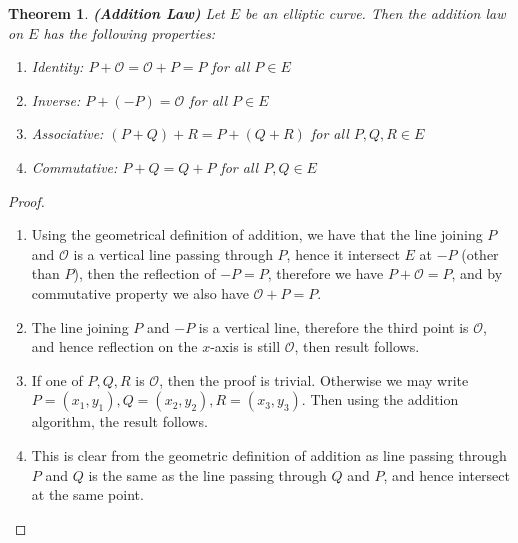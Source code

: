\documentclass[a4 paper]{article}
\newcommand{\?}{\stackrel{?}{=}}
\newtheorem{theorem}{Theorem}[section]
\begin{document}
\begin{tcolorbox}
\begin{theorem}
\textbf{(Addition Law)} Let $ E $ be an elliptic curve. Then the addition law on $ E $ has the following properties: 
\begin{enumerate}
    \item Identity: $ P+ \mathcal{O} = \mathcal{O} + P = P $ for all $  P \in E $
    \item Inverse: $ P + (-P) = \mathcal{O} $ for all $ P \in E $
    \item Associative: $ (P+Q) + R  = P + (Q +R) $  for all $ P, Q , R \in E $
    \item Commutative: $ P +Q = Q +P  $ for all $ P , Q \in E $
\end{enumerate}

\end{theorem}
\end{tcolorbox}

\begin{tcolorbox}[breakable,colback=blue!5!white, colframe=blue!50!black]
\begin{proof}
\begin{enumerate}
    \item Using the geometrical definition of addition, we have that the line joining $ P $ and $ \mathcal{O} $ is a vertical line passing through $ P $, hence it intersect $ E  $ at $ - P $ (other than $ P $), then the reflection of $ -P = P $, therefore we have $ P + \mathcal{O} = P  $, and by commutative property we also have $ \mathcal{O} + P = P  $. 
    \item The line joining $ P $ and $ -P $ is a vertical line, therefore the third point is $ \mathcal{O} $, and hence reflection on the $ x $-axis is still $ \mathcal{O} $, then result follows. 
    \item If one of $ P, Q, R  $ is $ \mathcal{O} $, then the proof is trivial. Otherwise we may write $ P = (x_1 , y_1 ), Q = (x_2, y_2 ) , R = (x_3 , y_3 ) $. Then using the addition algorithm, the result follows. 
    \item This is clear from the geometric definition of addition as line passing through $ P $ and $ Q $ is the same as the line passing through $ Q  $ and $ P $, and hence intersect at the same point. 
\end{enumerate}
\end{proof}
\end{tcolorbox}
\end{document}
